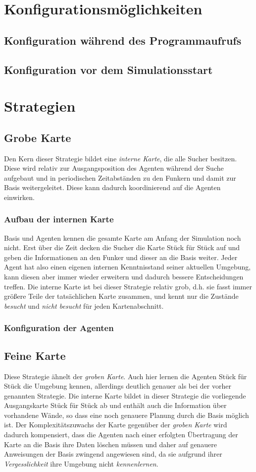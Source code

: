 \documentclass{scrartcl}
\begin{document}
\section{Konfigurationsmöglichkeiten}
\subsection{Konfiguration während des Programmaufrufs}
\subsection{Konfiguration vor dem Simulationsstart}

\section{Strategien}
\subsection{Grobe Karte}
Den Kern dieser Strategie bildet eine \emph{interne Karte}, die alle Sucher besitzen. Diese wird relativ zur Ausgangsposition des Agenten während der Suche aufgebaut und in periodischen Zeitabständen zu den Funkern und damit zur Basis weitergeleitet. Diese kann dadurch koordinierend auf die Agenten einwirken.
\subsubsection{Aufbau der internen Karte}
Basis und Agenten kennen die gesamte Karte am Anfang der Simulation noch nicht. Erst über die Zeit decken die Sucher die Karte Stück für Stück auf und geben die Informationen an den Funker und dieser an die Basis weiter.
Jeder Agent hat also einen eigenen internen Kenntnisstand seiner aktuellen Umgebung, kann diesen aber immer wieder erweitern und dadurch bessere Entscheidungen treffen.
Die interne Karte ist bei dieser Strategie relativ grob, d.h. sie fasst immer größere Teile der tatsächlichen Karte zusammen, und kennt nur die Zustände \emph{besucht} und \emph{nicht besucht} für jeden Kartenabschnitt.
\subsubsection{Konfiguration der Agenten}

\subsection{Feine Karte}
Diese Strategie ähnelt der \emph{groben Karte}. Auch hier lernen die Agenten Stück für Stück die Umgebung kennen, allerdings deutlich genauer als bei der vorher genannten Strategie.
Die interne Karte bildet in dieser Strategie die vorliegende Ausgangskarte Stück für Stück ab und enthält auch die Information über vorhandene Wände, so dass eine noch genauere Planung durch die Basis möglich ist.
Der Komplexitätszuwachs der Karte gegenüber der \emph{groben Karte} wird dadurch kompensiert, dass die Agenten nach einer erfolgten Übertragung der Karte an die Basis ihre Daten löschen müssen und daher auf genauere Anweisungen der Basis zwingend angewiesen sind, da sie aufgrund ihrer \emph{Vergesslichkeit} ihre Umgebung nicht \emph{kennenlernen}.
\end{document}
